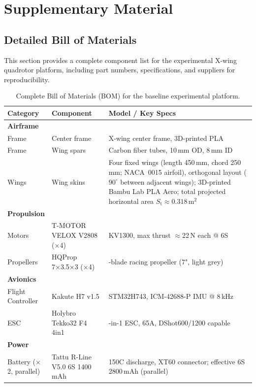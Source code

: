 
\appendix

\chapter{Supplementary Material}\label{chapter:appendix}

\section{Detailed Bill of Materials}\label{sec:bom-detailed}

This section provides a complete component list for the experimental X-wing quadrotor platform, including part numbers, specifications, and suppliers for reproducibility.

\begin{table}[h]
\centering
\caption{Complete Bill of Materials (BOM) for the baseline experimental platform.}
\label{tab:bom-detailed}
\small
\begin{tabularx}{\textwidth}{ll>{\raggedright\arraybackslash}X}
\toprule
Category & Component & Model / Key Specs \\
\midrule
\multicolumn{3}{l}{\textbf{Airframe}} \\
Frame & Center frame & X-wing center frame, 3D-printed PLA \\
Frame & Wing spars & Carbon fiber tubes, 10\,mm OD, 8\,mm ID \\
Wings & Wing skins & Four fixed wings (length 450\,mm, chord 250\,mm; NACA~0015 airfoil), orthogonal layout ($90^{\circ}$ between adjacent wings); 3D-printed Bambu Lab PLA Aero; total projected horizontal area $S_\mathrm{t}\approx 0.318$\,m$^2$ \\
\midrule
\multicolumn{3}{l}{\textbf{Propulsion}} \\
Motors & T-MOTOR VELOX V2808 ($\times$4) & KV1300, max thrust $\approx$22\,N each @ 6S \\
Propellers & HQProp 7×3.5×3 ($\times$4) & 3-blade racing propeller (7", light grey) \\
\midrule
\multicolumn{3}{l}{\textbf{Avionics}} \\
Flight Controller & Kakute H7 v1.5 & STM32H743, ICM-42688-P IMU @ 8\,kHz \\
ESC & Holybro Tekko32 F4 4in1 & 4-in-1 ESC, 65A, DShot600/1200 capable \\
\midrule
\multicolumn{3}{l}{\textbf{Power}} \\
Battery ($\times$2, parallel) & Tattu R-Line V5.0 6S 1400\,mAh & 150C discharge, XT60 connector; effective 6S 2800\,mAh (parallel) \\

\end{tabularx}
\end{table}
